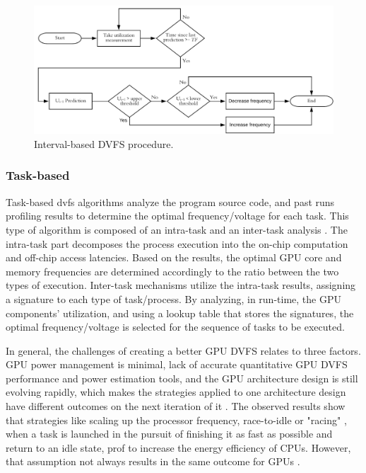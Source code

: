 \begin{figure}[htb]
  \centering
  \includegraphics[width=\textwidth]{Figures/Background/DVFSprogram.png}
  \caption{Interval-based DVFS procedure.}
  \label{fig:DVFSprocedure}
\end{figure}

\subsubsection{Task-based}

Task-based \acrshort{dvfs} algorithms analyze the program source code, and past runs profiling results to determine the optimal frequency/voltage for each task. This type of algorithm is composed of an intra-task and an inter-task analysis \cite{noauthor_time_nodate}. The intra-task part decomposes the process execution into the on-chip computation and off-chip access latencies. Based on the results,  the optimal GPU core and memory frequencies are determined accordingly to the ratio between the two types of execution. Inter-task mechanisms utilize the intra-task results, assigning a signature to each type of task/process. By analyzing, in run-time, the GPU components' utilization, and using a lookup table that stores the signatures, the optimal frequency/voltage is selected for the sequence of tasks to be executed.

\bigskip
In general, the challenges of creating a better GPU DVFS relates to three factors. GPU power management is minimal, lack of accurate quantitative GPU DVFS performance and power estimation tools, and the GPU architecture design is still evolving rapidly, which makes the strategies applied to one architecture design have different outcomes on the next iteration of it \cite{mei_survey_2016}. The observed results show that strategies like scaling up the processor frequency, race-to-idle  \cite{hoffmann_racing_2013} or "racing" \cite{kim_racing_2015}, when a task is launched in the pursuit of finishing it as fast as possible and return to an idle state, prof to increase the energy efficiency of CPUs. However, that assumption not always results in the same outcome for GPUs \cite{kim_racing_2015}. 

